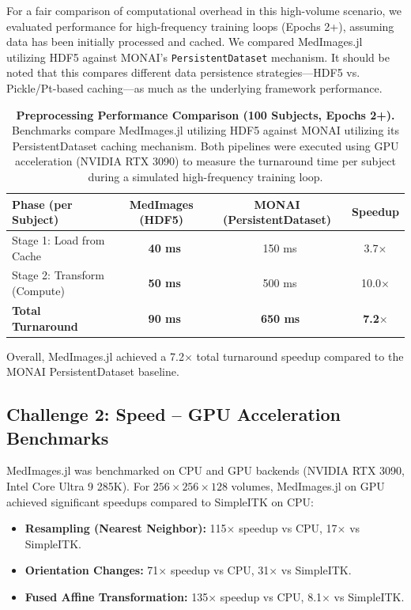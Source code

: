 \documentclass[10pt,letterpaper]{article}
\begin{document}
For a fair comparison of computational overhead in this high-volume scenario, we evaluated performance for high-frequency training loops (Epochs 2+), assuming data has been initially processed and cached. We compared MedImages.jl utilizing HDF5 against MONAI's \texttt{PersistentDataset} mechanism. It should be noted that this compares different data persistence strategies—HDF5 vs. Pickle/Pt-based caching—as much as the underlying framework performance.

\begin{table}[H]
\centering
\caption{\textbf{Preprocessing Performance Comparison (100 Subjects, Epochs 2+).} Benchmarks compare MedImages.jl utilizing HDF5 against MONAI utilizing its PersistentDataset caching mechanism. Both pipelines were executed using GPU acceleration (NVIDIA RTX 3090) to measure the turnaround time per subject during a simulated high-frequency training loop.}
\begin{tabular}{|l|c|c|c|}
\hline
\textbf{Phase (per Subject)} & \textbf{MedImages (HDF5)} & \textbf{MONAI (PersistentDataset)} & \textbf{Speedup} \\
\hline
Stage 1: Load from Cache & \textbf{~40 ms} & ~150 ms & 3.7$\times$ \\
Stage 2: Transform (Compute) & \textbf{~50 ms} & ~500 ms & 10.0$\times$ \\
\hline
\textbf{Total Turnaround} & \textbf{~90 ms} & \textbf{~650 ms} & \textbf{7.2$\times$} \\
\hline
\end{tabular}
\label{tab:scaling_comparison}
\end{table}

Overall, MedImages.jl achieved a 7.2$\times$ total turnaround speedup compared to the MONAI PersistentDataset baseline.

\subsection{Challenge 2: Speed -- GPU Acceleration Benchmarks}
MedImages.jl was benchmarked on CPU and GPU backends (NVIDIA RTX 3090, Intel Core Ultra 9 285K). For $256 \times 256 \times 128$ volumes, MedImages.jl on GPU achieved significant speedups compared to SimpleITK on CPU:
\begin{itemize}
    \item \textbf{Resampling (Nearest Neighbor):} 115$\times$ speedup vs CPU, 17$\times$ vs SimpleITK.
    \item \textbf{Orientation Changes:} 71$\times$ speedup vs CPU, 31$\times$ vs SimpleITK.
    \item \textbf{Fused Affine Transformation:} 135$\times$ speedup vs CPU, 8.1$\times$ vs SimpleITK.
\end{itemize}
\end{document}

